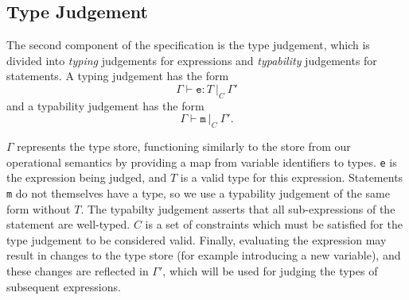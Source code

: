 \documentclass[12pt,a4paper,twoside,openright]{report}
\theoremstyle{definition}
\theoremstyle{dotless}
\newcommand*{\js}{\texttt}
\begin{document}
%
%

\subsection{Type Judgement} The second component of the specification is the
type judgement, which is divided into \textit{typing} judgements for
expressions and \textit{typability} judgements for statements. A typing
judgement has the form $$\Gamma\vdash \mathtt{e} : T\ |_C\ \Gamma'$$ and a typability
judgement has the form $$\Gamma \vdash \mathtt{m}\ |_C\ \Gamma'.$$

$\Gamma$ represents the type store, functioning similarly to the store from our
operational semantics by providing a map from variable identifiers to types.
\js{e} is the expression being judged, and $T$ is a valid type for this
expression. Statements \js{m} do not themselves have a type, so we use a
typability judgement of the same form without $T$. The typabilty judgement
asserts that all sub-expressions of the statement are well-typed. $C$ is a set
of constraints which must be satisfied for the type judgement to be considered
valid. Finally, evaluating the expression may result in changes to the type store (for
example introducing a new variable), and these changes are reflected in
$\Gamma'$, which will be used for judging the types of subsequent expressions.
\end{document}
